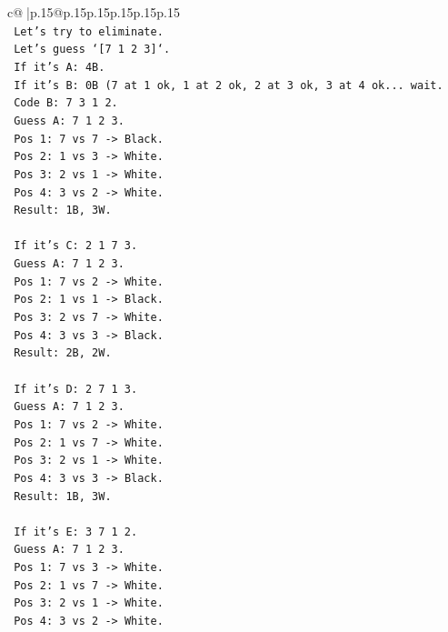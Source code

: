 \documentclass{article}
\begin{document}
{\begin{supertabular}{c@{$\;$}|p{.15\linewidth}@{}p{.15\linewidth}p{.15\linewidth}p{.15\linewidth}p{.15\linewidth}p{.15\linewidth}}
{{{\\ 
\texttt{    Let's try to eliminate.} \\
\texttt{    Let's guess `{[}7 1 2 3{]}`.} \\
\texttt{    If it's A: 4B.} \\
\texttt{    If it's B: 0B (7 at 1 ok, 1 at 2 ok, 2 at 3 ok, 3 at 4 ok... wait.} \\
\texttt{    Code B: 7 3 1 2.} \\
\texttt{    Guess A: 7 1 2 3.} \\
\texttt{    Pos 1: 7 vs 7 {-}> Black.} \\
\texttt{    Pos 2: 1 vs 3 {-}> White.} \\
\texttt{    Pos 3: 2 vs 1 {-}> White.} \\
\texttt{    Pos 4: 3 vs 2 {-}> White.} \\
\texttt{    Result: 1B, 3W.} \\
\\ 
\texttt{    If it's C: 2 1 7 3.} \\
\texttt{    Guess A: 7 1 2 3.} \\
\texttt{    Pos 1: 7 vs 2 {-}> White.} \\
\texttt{    Pos 2: 1 vs 1 {-}> Black.} \\
\texttt{    Pos 3: 2 vs 7 {-}> White.} \\
\texttt{    Pos 4: 3 vs 3 {-}> Black.} \\
\texttt{    Result: 2B, 2W.} \\
\\ 
\texttt{    If it's D: 2 7 1 3.} \\
\texttt{    Guess A: 7 1 2 3.} \\
\texttt{    Pos 1: 7 vs 2 {-}> White.} \\
\texttt{    Pos 2: 1 vs 7 {-}> White.} \\
\texttt{    Pos 3: 2 vs 1 {-}> White.} \\
\texttt{    Pos 4: 3 vs 3 {-}> Black.} \\
\texttt{    Result: 1B, 3W.} \\
\\ 
\texttt{    If it's E: 3 7 1 2.} \\
\texttt{    Guess A: 7 1 2 3.} \\
\texttt{    Pos 1: 7 vs 3 {-}> White.} \\
\texttt{    Pos 2: 1 vs 7 {-}> White.} \\
\texttt{    Pos 3: 2 vs 1 {-}> White.} \\
\texttt{    Pos 4: 3 vs 2 {-}> White.} \\
}}}
\end{supertabular}}
\end{document}
